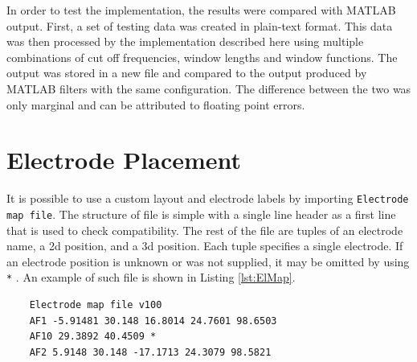 In order to test the implementation, the results were compared with MATLAB output. First, a set of testing data was created in plain-text format. This data was then processed by the implementation described here using multiple combinations of cut off frequencies, window lengths and window functions. The output was stored in a new file and compared to the output produced by MATLAB filters with the same configuration. The difference between the two was only marginal and can be attributed to floating point errors.

\section{Electrode Placement}
\label{sec:implElPlacement}
It is possible to use a custom layout and electrode labels by importing \texttt{Electrode map file}. The structure of file is simple with a single line header as a first line that is used to check compatibility. The rest of the file are tuples of an electrode name, a \gls{2d} position, and a \gls{3d} position. Each tuple specifies a single electrode. If an electrode position is unknown or was not supplied, it may be omitted by using \texttt{*} . An example of such file is shown in Listing \ref{lst:ElMap}.

\lstset{captionpos=b, caption=Electrode map file example, label=lst:ElMap}
\begin{lstlisting}
    Electrode map file v100
    AF1 -5.91481 30.148 16.8014 24.7601 98.6503
    AF10 29.3892 40.4509 *
    AF2 5.9148 30.148 -17.1713 24.3079 98.5821
\end{lstlisting}

